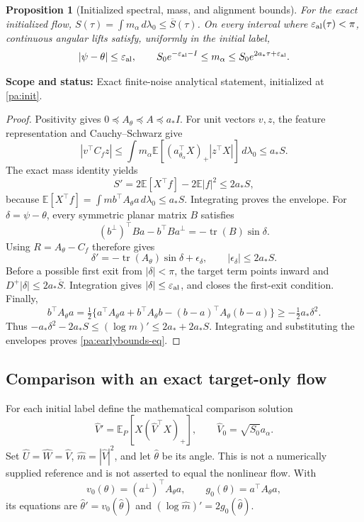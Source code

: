 \documentclass[11pt]{article}
\numberwithin{equation}{section}
\newtheorem{proposition}{Proposition}[section]
\theoremstyle{definition}
\theoremstyle{remark}
\newcommand{\E}{\mathbb E}
\newcommand{\1}{\mathbf 1}
\newcommand{\dd}{\,d}
\DeclareMathOperator{\tr}{tr}
\newcommand{\scope}[1]{\par\noindent\textbf{Scope and status:} #1\par\smallskip}
\begin{document}
\begin{proposition}[Initialized spectral, mass, and alignment bounds]
\label{pa:earlybounds}
For the exact initialized flow, $S(\tau)=\int m_\alpha\dd\lambda_0\le
\overline S(\tau)$. On every interval where
$\varepsilon_{\rm al}(\tau)<\pi$, continuous angular lifts satisfy, uniformly
in the initial label,
\begin{equation}\label{pa:earlybounds-eq}
 |\psi-\theta|\le\varepsilon_{\rm al},\qquad
 S_0e^{-\varepsilon_{\rm al}-I}\le m_\alpha
 \le S_0e^{2a_*\tau+\varepsilon_{\rm al}}.
\end{equation}
\end{proposition}
\scope{Exact finite-noise analytical statement, initialized at \eqref{pa:init}.}
\begin{proof}
Positivity gives $0\preceq A_\theta\preceq A\preceq a_*I$. For unit vectors
$v,z$, the feature representation and Cauchy--Schwarz give
\[
 |v^\top C_fz|
 \le\int m_\alpha\E[(a_{\theta_\alpha}^\top X)_+|z^\top X|]
 \dd\lambda_0\le a_*S.
\]
The exact mass identity yields
\[
 S'=2\E[X^\top f]-2\E|f|^2\le2a_*S,
\]
because $\E[X^\top f]=\int m b^\top A_\theta a\dd\lambda_0\le a_*S$.
Integrating proves the envelope.
For $\delta=\psi-\theta$, every symmetric planar matrix $B$ satisfies
\[
 (b^\perp)^\top Ba-b^\top Ba^\perp=-\tr(B)\sin\delta.
\]
Using $R=A_\theta-C_f$ therefore gives
\[
 \delta'=-\tr(A_\theta)\sin\delta+\epsilon_\delta,
 \qquad |\epsilon_\delta|\le2a_*S.
\]
Before a possible first exit from $|\delta|<\pi$, the target term points
inward and $D^+|\delta|\le2a_*\overline S$. Integration gives
$|\delta|\le\varepsilon_{\rm al}$, and closes the first-exit condition.
Finally,
\[
 b^\top A_\theta a
 =\tfrac12\{a^\top A_\theta a+b^\top A_\theta b
 -(b-a)^\top A_\theta(b-a)\}\ge-\tfrac12a_*\delta^2.
\]
Thus $-a_*\delta^2-2a_*S\le(\log m)'\le2a_*+2a_*S$.
Integrating and substituting the envelopes proves \eqref{pa:earlybounds-eq}.
\end{proof}

\subsection{Comparison with an exact target-only flow}
For each initial label define the mathematical comparison solution
\[
 \widehat V'=\E_P[X(\widehat V^\top X)_+],\qquad
 \widehat V_0=\sqrt{S_0}a_\alpha.
\]
Set $\widehat U=\widehat W=\widehat V$,
$\widehat m=|\widehat V|^2$, and let $\widehat\theta$ be its angle.
This is not a numerically supplied reference and is not asserted to equal
the nonlinear flow. With
\[
 v_0(\theta)=(a^\perp)^\top A_\theta a,\qquad
 g_0(\theta)=a^\top A_\theta a,
\]
its equations are $\widehat\theta'=v_0(\widehat\theta)$ and
$(\log\widehat m)'=2g_0(\widehat\theta)$.
\end{document}
